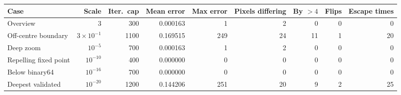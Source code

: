 \begin{tabular}{@{}lrrrrrrrr@{}}
\toprule
Case & Scale & Iter.\ cap & Mean error & Max error & Pixels differing & By $>4$ & Flips & Escape times \\
\midrule
Overview & $3$ & 300 & 0.000163 & 1 & 2 & 0 & 0 & 0 \\
Off-centre boundary & $3{\times}10^{-1}$ & 1100 & 0.169515 & 249 & 24 & 11 & 1 & 20 \\
Deep zoom & $10^{-5}$ & 700 & 0.000163 & 1 & 2 & 0 & 0 & 0 \\
Repelling fixed point & $10^{-10}$ & 400 & 0.000000 & 0 & 0 & 0 & 0 & 0 \\
Below binary64 & $10^{-16}$ & 700 & 0.000000 & 0 & 0 & 0 & 0 & 0 \\
Deepest validated & $10^{-20}$ & 1200 & 0.144206 & 251 & 20 & 9 & 2 & 25 \\
\bottomrule
\end{tabular}
